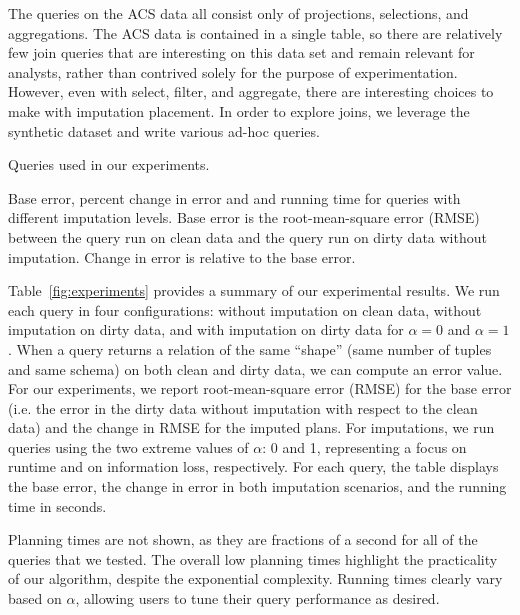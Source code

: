 The queries on the ACS data all consist only of projections, selections, and aggregations.
The ACS data is contained in a single table, so there are relatively few join queries that are interesting on this data set and remain relevant for analysts, rather
than contrived solely for the purpose of experimentation.
However, even with select, filter, and aggregate, there are interesting choices to make with imputation placement. In order to explore joins, we leverage the synthetic
dataset and write various ad-hoc queries.

\begin{table*}
  \centerfloat
  
  \caption{Queries used in our experiments.}
  \label{fig:queries}
\end{table*}

\begin{table}
  \centerfloat
  
    \caption{Base error, percent change in error and and running time for queries
    with different imputation levels. Base error is the root-mean-square error (RMSE) between the query run on clean
    data and the query run on dirty data without imputation. Change in error is relative to the base error.}
  \label{fig:experiments}
\end{table}

Table~\ref{fig:experiments} provides a summary of our experimental results.
We run each query in four configurations: without imputation on clean data, without imputation on dirty data, and with imputation on dirty data for $\alpha = 0$ and $\alpha = 1$.
When a query returns a relation of the same ``shape'' (same number of tuples and same schema) on both clean and dirty data, we can compute an error value.
For our experiments, we report root-mean-square error (RMSE) for the base error (i.e. the error in the dirty data without imputation with respect to the clean data) and the change
in RMSE for the imputed plans.
For imputations, we run queries using the two extreme values of $\alpha$: 0 and 1, representing a focus on runtime and on information loss, respectively.
For each query, the table displays the base error, the change in error in both imputation scenarios, and the running time in seconds.

Planning times are not shown, as they are fractions of a second for all of the queries that we tested.
The overall low planning times highlight the practicality of our algorithm, despite the exponential complexity.
Running times clearly vary based on $\alpha$, allowing users to tune their query performance as desired.

